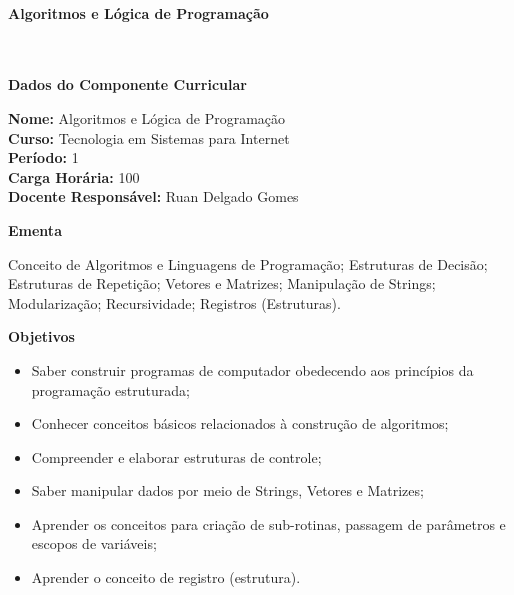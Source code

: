 \paragraph{Algoritmos e L\'ogica de Programa\c{c}\~ao} \


\begin{snugshade}\begin{center}\textbf{
    Dados do Componente Curricular
}\end{center}\end{snugshade}

\noindent \textbf{Nome:}                Algoritmos e L\'ogica de Programa\c{c}\~ao
\\        \textbf{Curso:}               Tecnologia em Sistemas para Internet
\\        \textbf{Período:}             \unit{1}{\degree}
\\        \textbf{Carga Horária:}       \unit{100}{\hour}
\\        \textbf{Docente Responsável:} Ruan Delgado Gomes


\begin{snugshade}\begin{center}\textbf{
    Ementa
\vphantom{q}}\end{center}\end{snugshade}

\noindent
Conceito de Algoritmos e Linguagens de Programação; Estruturas de Decisão; Estruturas de Repetição; Vetores e Matrizes; Manipulação de Strings; Modularização; Recursividade; Registros (Estruturas).

\begin{snugshade}\begin{center}\textbf{
    Objetivos
}\end{center}\end{snugshade}

\begin{itemize}

\item Saber construir programas de computador obedecendo aos princípios da programação estruturada;
\item Conhecer conceitos básicos relacionados à construção de algoritmos;
\item Compreender e elaborar estruturas de controle;
\item Saber manipular dados por meio de Strings, Vetores e Matrizes;
\item Aprender os conceitos para criação de sub-rotinas, passagem de parâmetros e escopos de variáveis;
\item Aprender o conceito de registro (estrutura).

\end{itemize} 

